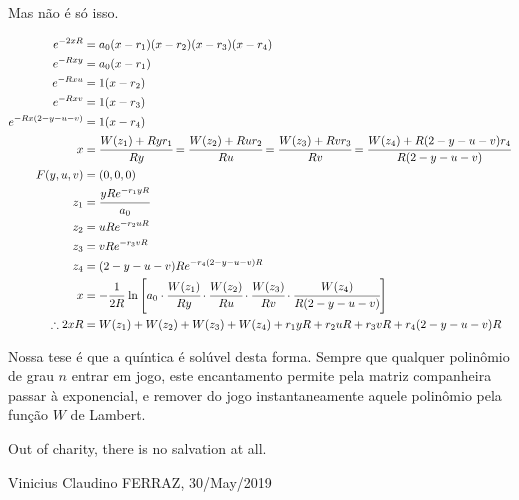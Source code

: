 \documentclass[11pt,a4paper]{article}
\begin{document}
\vspace{3mm}

Mas n\~ao \'e s\'o isso.

\begin{align}
  e^{-2xR} &= a_0 (x - r_1) (x - r_2) (x - r_3) (x - r_4) \\
  e^{-Rxy} &= a_0 (x - r_1) \\
  e^{-Rxu} &= 1 (x - r_2) \\
  e^{-Rxv} &= 1 (x - r_3) \\
  e^{-Rx(2 - y - u - v)} &= 1 (x - r_4) \\
  x &= \cfrac{W(z_1) + Ry r_1}{Ry} = \cfrac{W(z_2) + Ru r_2}{Ru} = \cfrac{W(z_3) + Rv r_3}{Rv} = \cfrac{W(z_4) + R(2 - y - u - v) r_4}{R(2 - y - u - v)} \\
  F(y,u,v) &= (0,0,0) \\
  z_1 &= \cfrac{yRe^{-r_1yR}}{a_0} \\
  z_2 &= uRe^{-r_2uR} \\
  z_3 &= vRe^{-r_3vR} \\
  z_4 &= (2-y-u-v)Re^{-r_4(2-y-u-v)R} \\
  x &= - \cfrac{1}{2R}\, \ln \left[ a_0 \cdot \cfrac{W(z_1)}{Ry} \cdot \cfrac{W(z_2)}{Ru} \cdot \cfrac{W(z_3)}{Rv} \cdot \cfrac{W(z_4)}{R(2 - y - u - v)} \right] \\
  \therefore 2xR &= W(z_1) + W(z_2) + W(z_3) + W(z_4) + r_1 y R + r_2 u R + r_3 v R + r_4 (2 - y - u - v) R
\end{align}

\vspace{3mm}

Nossa tese \'e que a qu\'intica \'e sol\'uvel desta forma. Sempre que qualquer polin\^omio de grau $n$ entrar em jogo, este encantamento permite pela matriz companheira passar \`a exponencial, e remover do jogo instantaneamente aquele polin\^omio pela fun\c{c}\~ao $W$ de Lambert.

\vspace{3mm}

Out of charity, there is no salvation at all.

\vspace{3mm}

Vinicius Claudino FERRAZ, 30/May/2019
\end{document}
